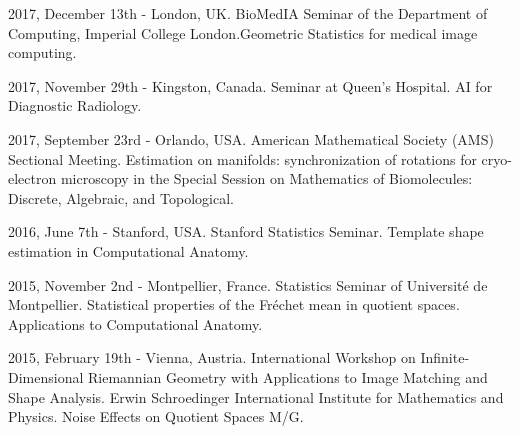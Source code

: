 2017, December 13th - London, UK. BioMedIA Seminar of the Department of Computing, Imperial College London.Geometric Statistics for medical image computing.

2017, November 29th - Kingston, Canada. Seminar at Queen's Hospital. AI for Diagnostic Radiology.

2017, September 23rd - Orlando, USA. American Mathematical Society (AMS) Sectional Meeting. Estimation on manifolds: synchronization of rotations for cryo-electron microscopy in the Special Session on Mathematics of Biomolecules: Discrete, Algebraic, and Topological.

2016, June 7th - Stanford, USA. Stanford Statistics Seminar. Template shape estimation in Computational Anatomy. 

2015, November 2nd - Montpellier, France. Statistics Seminar of Université de Montpellier. Statistical properties of the Fréchet mean in quotient spaces. Applications to Computational Anatomy. 

2015, February 19th - Vienna, Austria. International Workshop on Infinite-Dimensional Riemannian Geometry with Applications to Image Matching and Shape Analysis. Erwin Schroedinger International Institute for Mathematics and Physics. Noise Effects on Quotient Spaces M/G. 